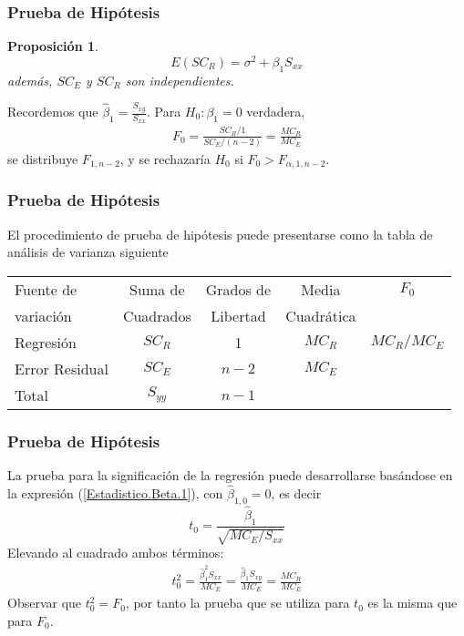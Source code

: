 \documentclass{beamer}
\newtheorem{Prop}{Proposici\'on}[section]
\begin{document}
\begin{frame}\frametitle{Prueba de Hip\'otesis}													
\begin{Prop}
\begin{equation}
E\left(SC_{R}\right)=\sigma^{2}+\beta_{1}S_{xx}
\end{equation}
adem\'as, $SC_{E}$ y $SC_{R}$ son independientes.
\end{Prop}
Recordemos que $\hat{\beta}_{1}=\frac{S_{xy}}{S_{xx}}$. Para $H_{0}:\beta_{1}=0$ verdadera,
\begin{eqnarray*}
F_{0}=\frac{SC_{R}/1}{SC_{E}/(n-2)}=\frac{MC_{R}}{MC_{E}}
\end{eqnarray*}
se distribuye $F_{1,n-2}$, y se rechazar\'ia $H_{0}$ si $F_{0}>F_{\alpha,1,n-2}$.
\end{frame}

\begin{frame}\frametitle{Prueba de Hip\'otesis}													
El procedimiento de prueba de hip\'otesis puede presentarse como la tabla de an\'alisis de varianza siguiente\medskip

\begin{tabular}{lcccc}\hline
Fuente de & Suma de  &  Grados de  & Media  & $F_{0}$ \\ 
 variaci\'on & Cuadrados & Libertad & Cuadr\'atica & \\\hline\pause
 Regresi\'on & $SC_{R}$ & 1 & $MC_{R}$  & $MC_{R}/MC_{E}$\\\pause
 Error Residual & $SC_{E}$ & $n-2$ & $MC_{E}$ & \\\hline\pause
 Total & $S_{yy}$ & $n-1$ & & \\\hline
\end{tabular} 
\end{frame}

\begin{frame}\frametitle{Prueba de Hip\'otesis}													
La prueba para la significaci\'on de la regresi\'on puede desarrollarse bas\'andose en la expresi\'on (\ref{Estadistico.Beta.1}), con $\hat{\beta}_{1,0}=0$, es decir\pause
\begin{equation}\label{Estadistico.Beta.1.Cero}
t_{0}=\frac{\hat{\beta}_{1}}{\sqrt{MC_{E}/S_{xx}}}
\end{equation}
Elevando al cuadrado ambos t\'erminos:
\begin{eqnarray*}
t_{0}^{2}=\frac{\hat{\beta}_{1}^{2}S_{xx}}{MC_{E}}=\frac{\hat{\beta}_{1}S_{xy}}{MC_{E}}=\frac{MC_{R}}{MC_{E}}
\end{eqnarray*}
Observar que $t_{0}^{2}=F_{0}$, por tanto la prueba que se utiliza para $t_{0}$ es la misma que para $F_{0}$.

\end{frame}
\end{document}
